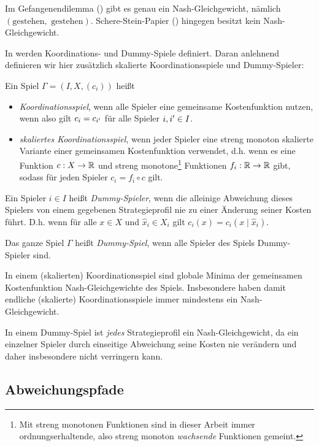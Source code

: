 \begin{bsp}
	Im Gefangenendilemma () gibt es genau ein Nash-Gleichgewicht, nämlich $(\text{gestehen},\text{ gestehen})$. Schere-Stein-Papier () hingegen besitzt kein Nash-Gleichgewicht.
\end{bsp}

In \cite[Definition 2.2]{KoordDummy} werden Koordinations- und Dummy-Spiele definiert. Daran anlehnend definieren wir hier zusätzlich skalierte Koordinationsspiele und Dummy-Spieler:
\begin{defn}
	Ein Spiel $\Gamma = (I, X, (c_i))$ heißt
	\begin{itemize}
		\item \emph{Koordinationsspiel}, wenn alle Spieler eine gemeinsame Kostenfunktion nutzen, wenn also gilt $c_i = c_{i'}$ für alle Spieler $i,{i'} \in I$.
		\item \emph{skaliertes Koordinationsspiel}, wenn jeder Spieler eine streng monoton skalierte Variante einer gemeinsamen Kostenfunktion verwendet, d.h. wenn es eine Funktion $c: X \to \mathbb{R}$ und streng monotone\footnote{Mit streng monotonen Funktionen sind in dieser Arbeit immer ordnungserhaltende, also streng monoton \emph{wachsende} Funktionen gemeint.} Funktionen $f_i: \mathbb{R} \to \mathbb{R}$ gibt, sodass für jeden Spieler $c_i = f_i \circ c$ gilt.
	\end{itemize}
	Ein Spieler $i \in I$ heißt \emph{Dummy-Spieler}, wenn die alleinige Abweichung dieses Spielers von einem gegebenen Strategieprofil nie zu einer Änderung seiner Kosten führt. D.h. wenn für alle $x \in X$ und $\hat{x}_i \in X_i$ gilt $c_i(x) = c_i(x \mid \hat{x}_i)$. 
	
	Das ganze Spiel $\Gamma$ heißt \emph{Dummy-Spiel}, wenn alle Spieler des Spiels Dummy-Spieler sind.
\end{defn}

\begin{beob}
	In einem (skalierten) Koordinationsspiel sind globale Minima der gemeinsamen Kostenfunktion Nash-Gleichgewichte des Spiels. Insbesondere haben damit endliche (skalierte) Koordinationsspiele immer mindestens ein Nash-Gleichgewicht.
	
	In einem Dummy-Spiel ist \emph{jedes} Strategieprofil ein Nash-Gleichgewicht, da ein einzelner Spieler durch einseitige Abweichung seine Kosten nie verändern und daher insbesondere nicht verringern kann.
\end{beob}


\subsection{Abweichungspfade}

